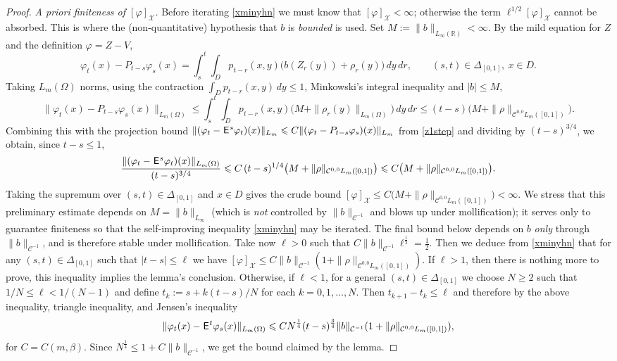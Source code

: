 \documentclass[12pt]{article}
\theoremstyle{definition}
\DeclareMathOperator{\1}{\mathbbm{1}}%
\def\E{\hskip.15ex\mathsf{E}\hskip.10ex}
\def\phi{\varphi}
\renewcommand{\ge}{\geqslant}
\renewcommand{\le}{\leqslant}
\newcommand{\C}{\mathcal{C}}
\newcommand{\R}{\mathbb{R}}
\newcommand{\X}{\mathcal{X}}
\begin{document}
\begin{proof}
\emph{A priori finiteness of $[\phi]_{\X}$.} Before iterating \eqref{xminyhn} we
must know that $[\phi]_{\X}<\infty$; otherwise the term $\ell^{1/2}[\phi]_{\X}$
cannot be absorbed. This is where the (non-quantitative) hypothesis that $b$ is
\emph{bounded} is used. Set $M:=\|b\|_{L_\infty(\R)}<\infty$. By the mild
equation for $Z$ and the definition $\phi=Z-V$,
\[
\phi_t(x)-P_{t-s}\phi_s(x)=\int_s^t\int_D p_{t-r}(x,y)\bigl(b(Z_r(y))+\rho_r(y)\bigr)\,dy\,dr ,
\qquad (s,t)\in\Delta_{[0,1]},\ x\in D .
\]
Taking $L_m(\Omega)$ norms, using the contraction $\int_D p_{t-r}(x,y)\,dy\le1$,
Minkowski's integral inequality and $|b|\le M$,
\[
\bigl\|\phi_t(x)-P_{t-s}\phi_s(x)\bigr\|_{L_m(\Omega)}
\le \int_s^t\int_D p_{t-r}(x,y)\bigl(M+\|\rho_r(y)\|_{L_m(\Omega)}\bigr)\,dy\,dr
\le (t-s)\bigl(M+\|\rho\|_{\C^{0,0}L_m([0,1])}\bigr).
\]
Combining this with the projection bound
$\|(\phi_t-\E^s\phi_t)(x)\|_{L_m}\le C\|(\phi_t-P_{t-s}\phi_s)(x)\|_{L_m}$
from \eqref{z1step} and dividing by $(t-s)^{3/4}$, we obtain, since $t-s\le1$,
\[
\frac{\|(\phi_t-\E^s\phi_t)(x)\|_{L_m(\Omega)}}{(t-s)^{3/4}}
\le C\,(t-s)^{1/4}\bigl(M+\|\rho\|_{\C^{0,0}L_m([0,1])}\bigr)
\le C\bigl(M+\|\rho\|_{\C^{0,0}L_m([0,1])}\bigr).
\]
Taking the supremum over $(s,t)\in\Delta_{[0,1]}$ and $x\in D$ gives the crude
bound $[\phi]_{\X}\le C\bigl(M+\|\rho\|_{\C^{0,0}L_m([0,1])}\bigr)<\infty$. We
stress that this preliminary estimate depends on $M=\|b\|_{L_\infty}$ (which is
\emph{not} controlled by $\|b\|_{\C^{-1}}$ and blows up under mollification); it
serves only to guarantee finiteness so that the self-improving inequality
\eqref{xminyhn} may be iterated. The final bound below depends on $b$
\emph{only} through $\|b\|_{\C^{-1}}$, and is therefore stable under mollification. 
Take now $\ell>0$ such that 
$
C  \|b\|_{\C^{-1}}
\ell^{\frac12}=\frac12.
$
Then we deduce from  \eqref{xminyhn} that for any $(s,t)\in\Delta_{[0,1]}$ such that $|t-s|\le \ell$ we have 
$[\phi]_{\X}\le C\|b\|_{\C^{-1}} (1+\|\rho\|_{\C^{0,0} L_m([0,1])}).$
If $\ell>1$, then there is nothing more to prove, this inequality
implies the lemma's conclusion. Otherwise, if $\ell<1$, for a general $(s,t)\in\Delta_{[0,1]}$ we choose $N\ge2$ such that $1/N\le \ell < 1/(N-1)$
and define $t_k:=s+k(t-s)/N$ for each $k=0,1,\hdots, N$. Then $t_{k+1}-t_k\le \ell$ and therefore by the above inequality, triangle inequality, and Jensen's inequality 
$$\|\phi_t(x)-\E^t \phi_s(x)\|_{L_m(\Omega)}
\le C N^{\frac14} (t-s)^{\frac34} \|b\|_{\C^{-1}}  (1+\|\rho\|_{\C^{0,0} L_m([0,1])}),
$$ 
for $C=C(m,\beta)$. 	Since $N^{\frac14}\le 1 + C \|b\|_{\C^{-1}}$,
we get the bound claimed by the lemma. 
\end{proof}
\end{document}

